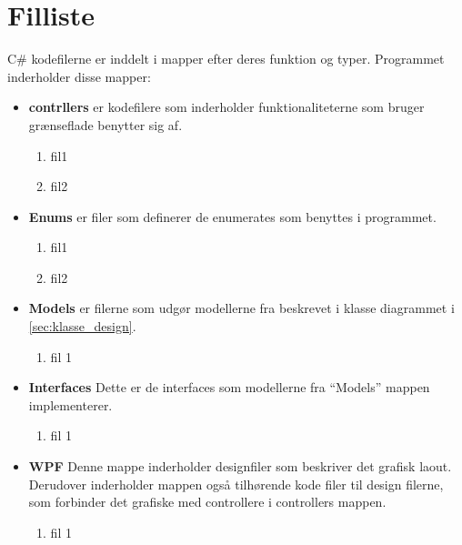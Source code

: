 \chapter{Filliste}
\label{cha:filliste}

C# kodefilerne er inddelt i mapper efter deres funktion og typer.
Programmet inderholder disse mapper:

\begin{itemize}
	\item \textbf{contrllers} er kodefilere som inderholder funktionaliteterne som bruger grænseflade benytter sig af. 
		\begin{enumerate}
			\item fil1
			\item fil2
		\end{enumerate}	
\end{itemize}


\begin{itemize}
	\item \textbf{Enums} er filer som definerer de enumerates som benyttes i programmet.
		\begin{enumerate}
			\item fil1
			\item fil2
		\end{enumerate}
\end{itemize}

\begin{itemize}
	\item \textbf{Models} er filerne som udgør modellerne fra beskrevet i klasse diagrammet i \cref{sec:klasse_design}.
		\begin{enumerate}
			\item fil 1 
		\end{enumerate}
\end{itemize}


\begin{itemize}
	\item \textbf{Interfaces} Dette er de interfaces som modellerne fra \enquote{Models} mappen implementerer.
		\begin{enumerate}
			\item fil 1
		\end{enumerate}
\end{itemize}

\begin{itemize}
	\item \textbf{WPF} Denne mappe inderholder designfiler som beskriver det grafisk laout. Derudover inderholder mappen også tilhørende kode filer til design filerne, som forbinder det grafiske med controllere i controllers mappen.
		\begin{enumerate}
			\item fil 1
		\end{enumerate}
\end{itemize}
